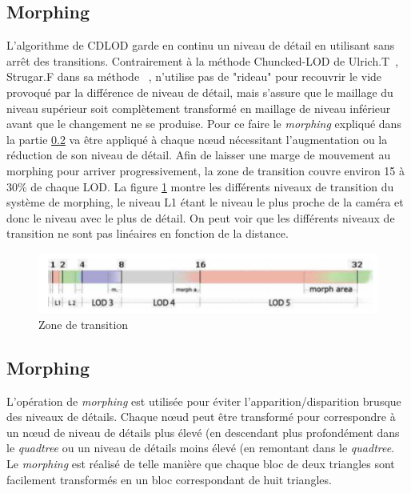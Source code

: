 \subsection{Morphing}
\label{subsec:interventionMorphing}
    L'algorithme de CDLOD garde en continu un niveau de détail en utilisant sans arrêt des transitions. Contrairement à la méthode Chuncked-LOD de Ulrich.T~\cite{CLOD}, Strugar.F dans sa méthode ~\cite{CDLOD}, n'utilise pas de "rideau" pour recouvrir le vide provoqué par la différence de niveau de détail, mais s'assure que le maillage du niveau supérieur soit complètement transformé en maillage de niveau inférieur avant que le changement ne se produise. Pour ce faire le \emph{morphing} expliqué dans la partie \ref{subsec:morphing} va être appliqué à chaque n\oe{}ud nécessitant l'augmentation ou la réduction de son niveau de détail. Afin de laisser une marge de mouvement au morphing pour arriver progressivement, la zone de transition couvre environ 15 à 30\% de chaque LOD. La figure \ref{fig:morph-area} montre les différents niveaux de transition du système de morphing, le niveau L1 étant le niveau le plus proche de la caméra et donc le niveau avec le plus de détail. On peut voir que les différents niveaux de transition ne sont pas linéaires en fonction de la distance.
\begin{figure}[!ht]
    \includegraphics[width=12cm]{img/morph-area.png}
    \caption[morph-area]{Zone de transition \protect\footnotemark}
    \label{fig:morph-area}
\end{figure}

\subsection{Morphing}
\label{subsec:morphing}

  L'opération de \emph{morphing} est utilisée pour éviter l'apparition/disparition brusque des niveaux de détails. Chaque n\oe{}ud peut être transformé pour correspondre à un n\oe{}ud de niveau de détails plus élevé (en descendant plus profondément dans le \emph{quadtree} ou un niveau de détails moins élevé (en remontant dans le \emph{quadtree}. Le \emph{morphing} est réalisé de telle manière que chaque bloc de deux triangles sont facilement transformés en un bloc correspondant de huit triangles.
  
